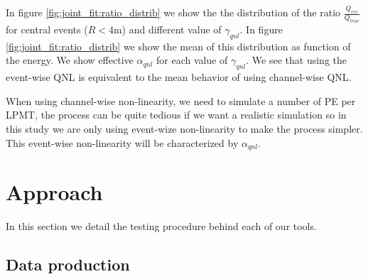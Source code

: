 \documentclass[../main.tex]{subfiles}
\begin{document}
In figure \ref{fig:joint_fit:ratio_distrib} we show the the distribution of the ratio $\frac{Q_{rec}}{Q_{true}}$ for central events ($R < 4$m) and different value of $\gamma_{qnl}$. In figure \ref{fig:joint_fit:ratio_distrib} we show the mean of this distribution as function of the energy. We show effective $\alpha_{qnl}$ for each value of $\gamma_{qnl}$. We see that using the event-wise QNL is equivalent to the mean behavior of using channel-wise QNL.

When using channel-wise non-linearity, we need to simulate a number of PE per LPMT, the process can be quite tedious if we want a realistic simulation so in this study we are only using event-wize non-linearity to make the process simpler. This event-wise non-linearity will be characterized by $\alpha_{qnl}$.

%
%
%

\section{Approach}
\label{sec:joint_fit:approach}

In this section we detail the testing procedure behind each of our tools.

%
%

\subsection{Data production}
\end{document}
